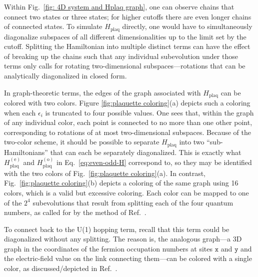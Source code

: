 \documentclass[aps,prd,twocolumn,showpacs,groupedaddress,superscriptaddress,nofootinbib,floatfix,preprintnumbers,longbibliography]{revtex4-1}
\begin{document}
Within Fig.~\ref{fig: 4D system and Hplaq graph}, one can observe chains that connect two states or three states; for higher cutoffs there are even longer chains of connected states. To simulate $H_{\mathrm{plaq}}$ directly, one would have to simultaneously diagonalize subspaces of all different dimensionalities up to the limit set by the cutoff. Splitting the Hamiltonian into multiple distinct terms can have the effect of breaking up the chains such that any individual subevolution under those terms only calls for rotating two-dimensional subspaces---rotations that can be analytically diagonalized in closed form.

In graph-theoretic terms, the edges of the graph associated with $H_{\mathrm{plaq}}$ can be colored with two colors. Figure \ref{fig:plaquette coloring}(a) depicts such a coloring when each $\epsilon_i$ is truncated to four possible values. One sees that, within the graph of any individual color, each point is connected to no more than one other point, corresponding to rotations of at most two-dimensional subspaces. Because of the two-color scheme, it should be possible to separate $H_{\mathrm{plaq}}$ into two ``sub-Hamiltonians'' that can each be separately diagonalized. This is exactly what $H_{\mathrm{plaq}}^{(\mathrm{e})}$ and $H_{\mathrm{plaq}}^{(\mathrm{o})}$ in Eq.~\eqref{eq:even-odd-H} correspond to, so they may be identified with the two colors of Fig.~\ref{fig:plaquette coloring}(a). In contrast, Fig.~\ref{fig:plaquette coloring}(b) depicts a coloring of the same graph using 16 colors, which is a valid but excessive coloring.
Each color can be mapped to one of the $2^4$ subevolutions that result from splitting each of the four quantum numbers, as called for by the method of Ref.~\cite{Kan:2021xfc}.

To connect back to the U(1) hopping term, recall that this term could be diagonalized without any splitting. The reason is, the analogous graph---a 3D graph in the coordinates of the fermion occupation numbers at sites $\mathtt{x}$ and $\mathtt{y}$ and the electric-field value on the link connecting them---can be colored with a single color, as discussed/depicted in Ref.~\cite{Stryker:2021asy}.
\end{document}
